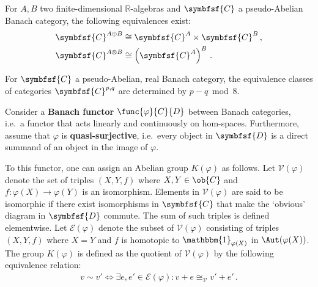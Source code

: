     \begin{property}
        For $A,B$ two finite-dimensional $\mathbb{R}$-algebras and $\symbfsf{C}$ a pseudo-Abelian Banach category, the following equivalences exist:
        \begin{gather}
            \begin{aligned}
                \symbfsf{C}^{A\oplus B}&\cong\symbfsf{C}^A\times\symbfsf{C}^B\,,\\
                \symbfsf{C}^{A\otimes B}&\cong\left(\symbfsf{C}^A\right)^B\,.
            \end{aligned}
        \end{gather}
    \end{property}
    \begin{property}\label{clifford:bott_periodicity_category}
        For $\symbfsf{C}$ a pseudo-Abelian, real Banach category, the equivalence classes of categories $\symbfsf{C}^{p,q}$ are determined by $p-q\bmod8$.
    \end{property}

    \begin{construct}\label{clifford:functor_k_group}
        Consider a \textbf{Banach functor} $\func{\varphi}{C}{D}$ between Banach categories, i.e.~a functor that acts linearly and continuously on hom-spaces. Furthermore, assume that $\varphi$ is \textbf{quasi-surjective}, i.e.~every object in $\symbfsf{D}$ is a direct summand of an object in the image of $\varphi$.

        To this functor, one can assign an Abelian group $K(\varphi)$ as follows. Let $\mathscr{V}(\varphi)$ denote the set of triples $(X,Y,f)$ where $X,Y\in\ob{C}$ and $f:\varphi(X)\rightarrow\varphi(Y)$ is an isomorphism. Elements in $\mathscr{V}(\varphi)$ are said to be isomorphic if there exist isomorphisms in $\symbfsf{C}$ that make the `obvious' diagram in $\symbfsf{D}$ commute. The sum of such triples is defined elementwise. Let $\mathscr{E}(\varphi)$ denote the subset of $\mathscr{V}(\varphi)$ consisting of triples $(X,Y,f)$ where $X=Y$ and $f$ is homotopic to $\mathbbm{1}_{\varphi(X)}$ in $\Aut(\varphi(X))$. The group $K(\varphi)$ is defined as the quotient of $\mathscr{V}(\varphi)$ by the following equivalence relation:
        \begin{gather}
            v\sim v'\iff\exists e,e'\in\mathscr{E}(\varphi):v+e\cong_{\mathscr{V}}v'+e'\,.
        \end{gather}
    \end{construct}

